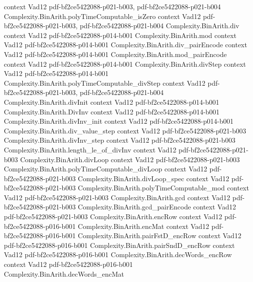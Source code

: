 \begin{theorem}
  {context}
  {Vad12}
  {pdf-bf2ce5422088-p021-b003,
    pdf-bf2ce5422088-p021-b004}
\proofstep
  {Complexity.BinArith.polyTimeComputable_isZero}
  {context}
  {Vad12}
  {pdf-bf2ce5422088-p021-b003,
    pdf-bf2ce5422088-p021-b004}
\proofstep
  {Complexity.BinArith.div}
  {context}
  {Vad12}
  {pdf-bf2ce5422088-p014-b001}
\proofstep
  {Complexity.BinArith.mod}
  {context}
  {Vad12}
  {pdf-bf2ce5422088-p014-b001}
\proofstep
  {Complexity.BinArith.div_pairEncode}
  {context}
  {Vad12}
  {pdf-bf2ce5422088-p014-b001}
\proofstep
  {Complexity.BinArith.mod_pairEncode}
  {context}
  {Vad12}
  {pdf-bf2ce5422088-p014-b001}
\proofstep
  {Complexity.BinArith.divStep}
  {context}
  {Vad12}
  {pdf-bf2ce5422088-p014-b001}
\proofstep
  {Complexity.BinArith.polyTimeComputable_divStep}
  {context}
  {Vad12}
  {pdf-bf2ce5422088-p021-b003,
    pdf-bf2ce5422088-p021-b004}
\proofstep
  {Complexity.BinArith.divInit}
  {context}
  {Vad12}
  {pdf-bf2ce5422088-p014-b001}
\proofstep
  {Complexity.BinArith.DivInv}
  {context}
  {Vad12}
  {pdf-bf2ce5422088-p014-b001}
\proofstep
  {Complexity.BinArith.divInv_init}
  {context}
  {Vad12}
  {pdf-bf2ce5422088-p014-b001}
\proofstep
  {Complexity.BinArith.div_value_step}
  {context}
  {Vad12}
  {pdf-bf2ce5422088-p021-b003}
\proofstep
  {Complexity.BinArith.divInv_step}
  {context}
  {Vad12}
  {pdf-bf2ce5422088-p021-b003}
\proofstep
  {Complexity.BinArith.length_le_of_divInv}
  {context}
  {Vad12}
  {pdf-bf2ce5422088-p021-b003}
\proofstep
  {Complexity.BinArith.divLoop}
  {context}
  {Vad12}
  {pdf-bf2ce5422088-p021-b003}
\proofstep
  {Complexity.BinArith.polyTimeComputable_divLoop}
  {context}
  {Vad12}
  {pdf-bf2ce5422088-p021-b003}
\proofstep
  {Complexity.BinArith.divLoop_spec}
  {context}
  {Vad12}
  {pdf-bf2ce5422088-p021-b003}
\proofstep
  {Complexity.BinArith.polyTimeComputable_mod}
  {context}
  {Vad12}
  {pdf-bf2ce5422088-p021-b003}
\proofstep
  {Complexity.BinArith.gcd}
  {context}
  {Vad12}
  {pdf-bf2ce5422088-p021-b003}
\proofstep
  {Complexity.BinArith.gcd_pairEncode}
  {context}
  {Vad12}
  {pdf-bf2ce5422088-p021-b003}
\proofstep
  {Complexity.BinArith.encRow}
  {context}
  {Vad12}
  {pdf-bf2ce5422088-p016-b001}
\proofstep
  {Complexity.BinArith.encMat}
  {context}
  {Vad12}
  {pdf-bf2ce5422088-p016-b001}
\proofstep
  {Complexity.BinArith.pairFstD_encRow}
  {context}
  {Vad12}
  {pdf-bf2ce5422088-p016-b001}
\proofstep
  {Complexity.BinArith.pairSndD_encRow}
  {context}
  {Vad12}
  {pdf-bf2ce5422088-p016-b001}
\proofstep
  {Complexity.BinArith.decWords_encRow}
  {context}
  {Vad12}
  {pdf-bf2ce5422088-p016-b001}
\proofstep
  {Complexity.BinArith.decWords_encMat}

\end{theorem}
